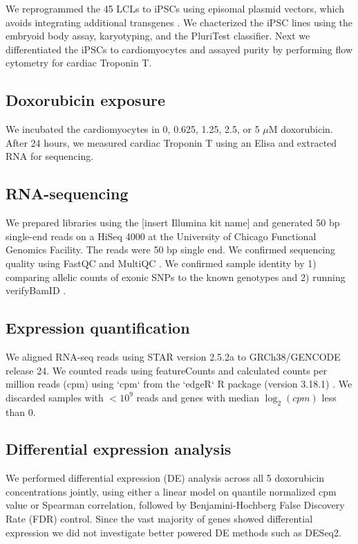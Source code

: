 \documentclass{article}
\begin{document}
{We reprogrammed the 45 LCLs to iPSCs using episomal plasmid vectors,
which avoids integrating additional transgenes \cite{Okita2011}. We
chacterized the iPSC lines using the embryoid body assay, karyotyping,
and the PluriTest \cite{Muller2011} classifier. Next we differentiated
the iPSCs to cardiomyocytes \cite{Lian2013, Burridge2014} and assayed
purity by performing flow cytometry for cardiac Troponin T.

\subsection*{Doxorubicin exposure}

We incubated the cardiomyocytes in 0, 0.625, 1.25, 2.5, or 5 $\mu$M
doxorubicin. After 24 hours, we measured cardiac Troponin T using an
Elisa and extracted RNA for sequencing.

\subsection*{RNA-sequencing}

We prepared libraries using the [insert Illumina kit name] and
generated 50 bp single-end reads on a HiSeq 4000 at the University of
Chicago Functional Genomics Facility. The reads were 50 bp single
end. We confirmed sequencing quality using FastQC and MultiQC
\cite{Ewels2016}.  We confirmed sample identity by 1) comparing
allelic counts of exonic SNPs to the known genotypes and 2) running
verifyBamID \cite{Jun2012}.

\subsection*{Expression quantification}

We aligned RNA-seq reads using STAR version 2.5.2a \cite{Dobin2013} to GRCh38/GENCODE release 24. We counted reads using featureCounts \cite{Liao2014} and calculated counts per million reads (cpm) using `cpm` from the `edgeR` R package (version 3.18.1) \cite{Robinson2010}. We discarded samples with $<10^9$ reads and genes with median $\log_2(cpm)$ less than $0$.

\subsection*{Differential expression analysis} 

We performed differential expression (DE) analysis across all 5 doxorubicin concentrations jointly, using either a linear model on quantile normalized cpm value or Spearman correlation, followed by Benjamini-Hochberg False Discovery Rate (FDR) control. Since the vast majority of genes showed differential expression we did not investigate better powered DE methods such as DESeq2. 

}
\end{document}

